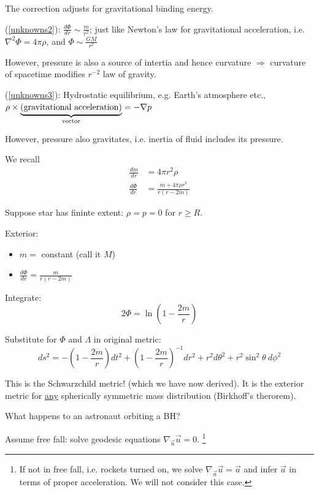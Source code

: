 \documentclass[a4paper]{article} %
\begin{document}
The correction adjusts for gravitational binding energy.

\HRule

(\ref{unknowns2}): $\frac{d\Phi}{dr}\sim \frac{m}{r^2}$; just like Newton's law for gravitational acceleration, i.e. $\nabla^2 \Phi = 4\pi \rho$, and $\Phi\sim\frac{GM}{r^2}$

However, pressure is also a source of intertia and hence curvature $\Rightarrow$ curvature of spacetime modifies $r^{-2}$ law of gravity.

\HRule

(\ref{unknowns3}): Hydrostatic equilibrium, e.g. Earth's atmosphere etc., $\rho\times\underbrace{\text{(gravitational acceleration)}}_{\mathclap{\text{vector}}}=-\nabla p$

However, pressure also gravitates, i.e. inertia of fluid includes its pressure.

\HRule

We recall 
\begin{align}
\frac{dm}{dr}&=4\pi r^2 \rho\\
\frac{d\Phi}{dr}&=\frac{m+4\pi \rho r^3}{r(r-2m)}
\end{align}

Suppose star has fininte extent: $\rho=p=0$ for $r\geq R$.

Exterior: 
\begin{itemize}
\item $m=$ constant (call it $M$)
\item $\frac{d\Phi}{dr}=\frac{m}{r(r-2m)}$
\end{itemize}

Integrate:
\begin{equation}
2\Phi=\ln \left(1-\frac{2m}{r}\right)
\end{equation}

Substitute for $\Phi$ and $\Lambda$ in original metric:
\begin{equation}
ds^2=-\left(1-\frac{2m}{r}\right)dt^2+\left(1-\frac{2m}{r}\right)^{-1}dr^2 + r^2 d\theta^2
+r^2\sin^2 \theta~d\phi^2
\end{equation}

This is the Schwarzchild metric! (which we have now derived). It is the exterior metric for \underline{any} spherically symmetric mass distribution (Birkhoff's therorem).

What happens to an astronaut orbiting a BH?

Assume free fall: solve geodesic equations $\nabla_{\vec{u}}\vec{u}=0$. \footnote{If not in free fall, i.e. rockets turned on, we solve $\nabla_{\vec{u}}\vec{u}=\vec{a}$ and infer $\vec{a}$ in terms of proper acceleration. We will not consider this case.}
\end{document}
